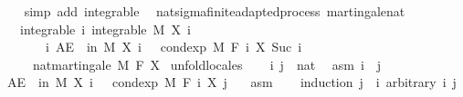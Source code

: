 \begin{isabellebody}
\ \ \isamarkupfalse%
\isanewline
{}\isamarkupfalse%
\ {\isacharparenleft}{\kern0pt}simp\ add{\isacharcolon}{\kern0pt}\ integrable{\isacharparenright}{\kern0pt}%
\endisatagproof
{\isafoldproof}%
%
\isadelimproof
\isanewline
%
\endisadelimproof
\isanewline
{}\isamarkupfalse%
\ {\isacharparenleft}{\kern0pt}\ nat{\isacharunderscore}{\kern0pt}sigma{\isacharunderscore}{\kern0pt}finite{\isacharunderscore}{\kern0pt}adapted{\isacharunderscore}{\kern0pt}process{\isacharparenright}{\kern0pt}\ martingale{\isacharunderscore}{\kern0pt}nat{\isacharcolon}{\kern0pt}\isanewline
\ \ \ integrable{\isacharcolon}{\kern0pt}\ {\isachardoublequoteopen}{\isasymAnd}i{\isachardot}{\kern0pt}\ integrable\ M\ {\isacharparenleft}{\kern0pt}X\ i{\isacharparenright}{\kern0pt}{\isachardoublequoteclose}\ \isanewline
\ \ \ \ \ \ \ {\isachardoublequoteopen}{\isasymAnd}i{\isachardot}{\kern0pt}\ AE\ {\isasymxi}\ in\ M{\isachardot}{\kern0pt}\ X\ i\ {\isasymxi}\ {\isacharequal}{\kern0pt}\ cond{\isacharunderscore}{\kern0pt}exp\ M\ {\isacharparenleft}{\kern0pt}F\ i{\isacharparenright}{\kern0pt}\ {\isacharparenleft}{\kern0pt}X\ {\isacharparenleft}{\kern0pt}Suc\ i{\isacharparenright}{\kern0pt}{\isacharparenright}{\kern0pt}\ {\isasymxi}{\isachardoublequoteclose}\ \isanewline
\ \ \ \ \ {\isachardoublequoteopen}nat{\isacharunderscore}{\kern0pt}martingale\ M\ F\ X{\isachardoublequoteclose}\isanewline
%
\isadelimproof
%
\endisadelimproof
%
\isatagproof
{}\isamarkupfalse%
\ {\isacharparenleft}{\kern0pt}unfold{\isacharunderscore}{\kern0pt}locales{\isacharparenright}{\kern0pt}\isanewline
\ \ \isamarkupfalse%
\ i\ j\ {\isacharcolon}{\kern0pt}{\isacharcolon}{\kern0pt}\ nat\ \isamarkupfalse%
\ asm{\isacharcolon}{\kern0pt}\ {\isachardoublequoteopen}i\ {\isasymle}\ j{\isachardoublequoteclose}\isanewline
\ \ \isamarkupfalse%
\ {\isachardoublequoteopen}AE\ {\isasymxi}\ in\ M{\isachardot}{\kern0pt}\ X\ i\ {\isasymxi}\ {\isacharequal}{\kern0pt}\ cond{\isacharunderscore}{\kern0pt}exp\ M\ {\isacharparenleft}{\kern0pt}F\ i{\isacharparenright}{\kern0pt}\ {\isacharparenleft}{\kern0pt}X\ j{\isacharparenright}{\kern0pt}\ {\isasymxi}{\isachardoublequoteclose}\ \isamarkupfalse%
\ asm\isanewline
\ \ \isamarkupfalse%
\ {\isacharparenleft}{\kern0pt}induction\ {\isachardoublequoteopen}j\ {\isacharminus}{\kern0pt}\ i{\isachardoublequoteclose}\ arbitrary{\isacharcolon}{\kern0pt}\ i\ j{\isacharparenright}{\kern0pt}\isanewline

\end{isabellebody}
